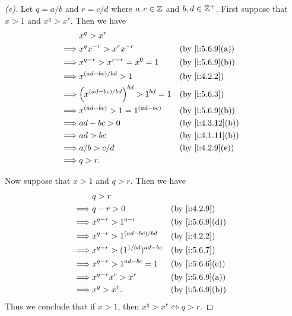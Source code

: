 \begin{proof}[(e)]
  Let \(q = a / b\) and \(r = c / d\) where \(a, c \in \mathbb{Z}\) and \(b, d \in \mathbb{Z}^+\).
  First suppose that \(x > 1\) and \(x^q > x^r\).
  Then we have
  \begin{align*}
             & x^q > x^r                                                       \\
    \implies & x^q x^{-r} > x^r x^{-r}                   &  & \by{i:5.6.9}[a]  \\
    \implies & x^{q - r} > x^{r - r} = x^0 = 1           &  & \by{i:5.6.9}[b]  \\
    \implies & x^{(ad - bc) / bd} > 1                    &  & \by{i:4.2.2}     \\
    \implies & \pa{x^{(ad - bc) / bd}}^{bd} > 1^{bd} = 1 &  & \by{i:5.6.3}     \\
    \implies & x^{(ad - bc)} > 1 = 1^{(ad - bc)}         &  & \by{i:5.6.9}[b]  \\
    \implies & ad - bc > 0                               &  & \by{i:4.3.12}[b] \\
    \implies & ad > bc                                   &  & \by{i:4.1.11}[b] \\
    \implies & a / b > c / d                             &  & \by{i:4.2.9}[e]  \\
    \implies & q > r.
  \end{align*}

  Now suppose that \(x > 1\) and \(q > r\).
  Then we have
  \begin{align*}
             & q > r                                                   \\
    \implies & q - r > 0                          &  & \by{i:4.2.9}    \\
    \implies & x^{q - r} > 1^{q - r}              &  & \by{i:5.6.9}[d] \\
    \implies & x^{q - r} > 1^{(ad - bc) / bd}     &  & \by{i:4.2.2}    \\
    \implies & x^{q - r} > (1^{1 / bd})^{ad - bc} &  & \by{i:5.6.7}    \\
    \implies & x^{q - r} > 1^{ad - bc} = 1        &  & \by{i:5.6.6}[e] \\
    \implies & x^{q - r} x^r > x^r                &  & \by{i:5.6.9}[a] \\
    \implies & x^q > x^r.                         &  & \by{i:5.6.9}[b]
  \end{align*}
  Thus we conclude that if \(x > 1\), then \(x^q > x^r \iff q > r\).


\end{proof}
